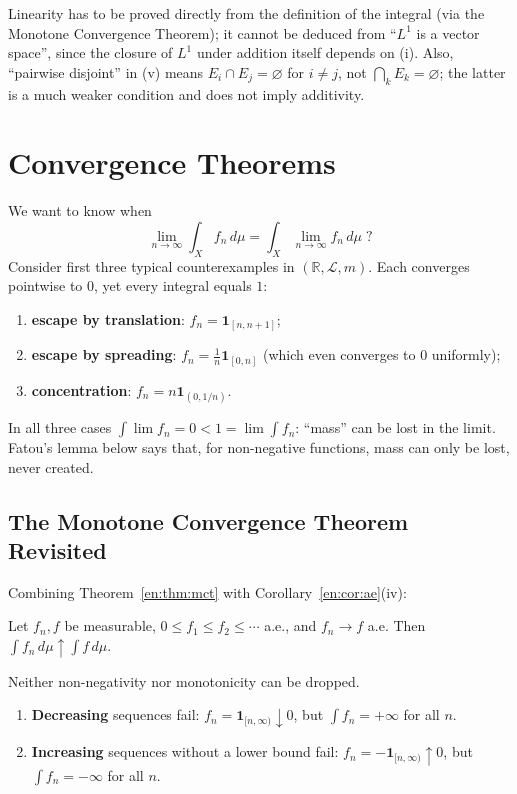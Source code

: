 \documentclass[11pt]{article}
\makeatletter
\newcommand{\envlabel}[1]{\protected@edef\@currentlabel{\themathenv}\label{#1}}
\makeatother
\begin{document}
\begin{remark}
Linearity has to be proved directly from the definition of the integral (via the Monotone Convergence Theorem); it cannot be deduced from ``$L^{1}$ is a vector space'', since the closure of $L^{1}$ under addition itself depends on (i). Also, ``pairwise disjoint'' in (v) means $E_{i}\cap E_{j}=\varnothing$ for $i\neq j$, not $\bigcap_{k}E_{k}=\varnothing$; the latter is a much weaker condition and does not imply additivity.
\end{remark}

\section{Convergence Theorems}

We want to know when
\[
\lim_{n\to\infty}\int_{X}f_{n}\,d\mu=\int_{X}\lim_{n\to\infty}f_{n}\,d\mu\;?
\]
Consider first three typical counterexamples in $(\mathbb{R},\mathcal{L},m)$. Each converges pointwise to $0$, yet every integral equals $1$:
\begin{enumerate}
  \item \textbf{escape by translation}: $f_{n}=\mathbf{1}_{[n,n+1]}$;
  \item \textbf{escape by spreading}: $f_{n}=\frac1n\mathbf{1}_{[0,n]}$ (which even converges to $0$ uniformly);
  \item \textbf{concentration}: $f_{n}=n\mathbf{1}_{(0,1/n)}$.
\end{enumerate}
In all three cases $\int\lim f_{n}=0<1=\lim\int f_{n}$: ``mass'' can be lost in the limit. Fatou's lemma below says that, for non-negative functions, mass can only be lost, never created.

\subsection{The Monotone Convergence Theorem Revisited}

Combining Theorem~\ref{en:thm:mct} with Corollary~\ref{en:cor:ae}(iv):

\begin{theorem}\envlabel{en:thm:mct2}
Let $f_{n},f$ be measurable, $0\leq f_{1}\leq f_{2}\leq\cdots$ a.e., and $f_{n}\to f$ a.e. Then $\int f_{n}\,d\mu\uparrow\int f\,d\mu$.
\end{theorem}

\begin{remark}\envlabel{en:rem:mct}
Neither non-negativity nor monotonicity can be dropped.
\begin{enumerate}
  \item \textbf{Decreasing} sequences fail: $f_{n}=\mathbf{1}_{[n,\infty)}\downarrow0$, but $\int f_{n}=+\infty$ for all $n$.
  \item \textbf{Increasing} sequences without a lower bound fail: $f_{n}=-\mathbf{1}_{[n,\infty)}\uparrow0$, but $\int f_{n}=-\infty$ for all $n$.
\end{enumerate}
\end{remark}
\end{document}
